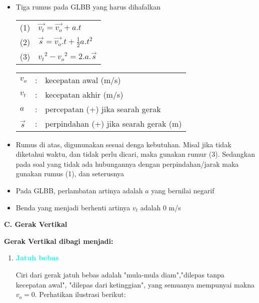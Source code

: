 \documentclass[10pt,a4paper]{article}
\begin{document}
\begin{multicols*}{2}
\begin{itemize}[itemsep=0mm,topsep=0mm,leftmargin=*]
\item Tiga rumus pada GLBB yang harus dihafalkan 
\renewcommand{\arraystretch}{1}
\begin{rumus}\begin{tabular}{ll}
(1) &$\vec{v_t}=\vec{v_o} +a.t$ \\
(2) &\phantom{$_t$}$\vec{s} = \vec{v_o}.t + \frac{1}{2}a.t^2$\\
(3) &${v_t}^2-{v_o}^2= 2.a.\vec{s}$\\
\end{tabular}
 

\begin{tabular}{lll}
$v_o$ &:&kecepatan awal (m/s) \\
$v_t$ &:&kecepatan akhir (m/s) \\
$a$ &:& percepatan (+) jika searah gerak\\
$\vec{s}$ &:& perpindahan (+) jika searah gerak (m) \\
\end{tabular}
\end{rumus}
\item Rumus di atas, digununakan sesuai denga kebutuhan. Misal jika tidak diketahui waktu, dan tidak perlu dicari, maka gunakan rumur (3). Sedangkan pada soal yang tidak ada hubungannya dengan perpindahan/jarak maka gunakan rumus (1), dan seterusnya
\item Pada GLBB, perlambatan artinya adalah $a$ yang bernilai negarif

\item Benda yang menjadi berhenti artinya $v_t$ adalah 0 m/s

\end{itemize}

\begin{catatan}\textbf{C. Gerak Vertikal}\end{catatan}
\textbf{Gerak Vertikal dibagi menjadi:}
\begin{enumerate}[label=\Alph*.,topsep=0mm,leftmargin=*]
\item \textbf{\textcolor{cyan}{Jatuh bebas}}

Ciri dari gerak jatuh bebas adalah "mula-mula diam","dilepas tanpa kecepatan awal", "dilepas dari ketinggian", yang semuanya mempunyai makna \textbf{$v_o=0$}. Perhatikan ilustrasi berikut:



\end{enumerate}
\end{multicols*}
\end{document}
